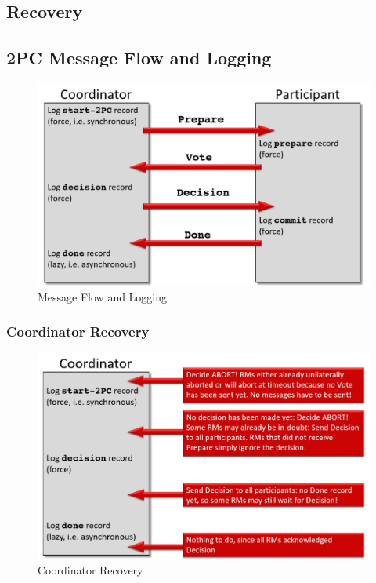 		\newpage	
		\subsection{Recovery}
			\subsection{2PC Message Flow and Logging}
				\begin{figure}[h!]
					\includegraphics[scale=0.25]{res/message-flow_logging.jpg}
					\caption{Message Flow and Logging}
				\end{figure}
			\subsubsection{Coordinator Recovery}
				\begin{figure}[h!]
					\includegraphics[scale=0.25]{res/coordinator_recovery.jpg}
					\caption{Coordinator Recovery}
				\end{figure}

